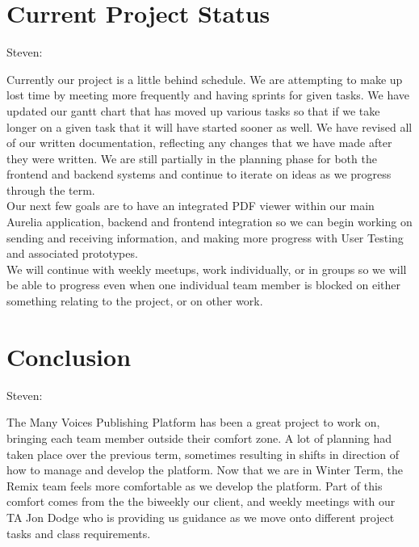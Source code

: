 \documentclass[onecolumn, draftclsnofoot,10pt, compsoc]{IEEEtran}
\begin{document}
\section{Current Project Status}
\noindent Steven:

\noindent Currently our project is a little behind schedule. We are attempting to make up
lost time by meeting more frequently and having sprints for given tasks. We have updated our 
gantt chart that has moved up various tasks so that if we take longer on a given task that 
it will have started sooner as well. We have revised all of our written documentation, reflecting
any changes that we have made after they were written. We are still partially in the planning 
phase for both the frontend and backend systems and continue to iterate on ideas as we progress
through the term. \\

\noindent Our next few goals are to have an integrated PDF viewer within our main Aurelia 
application, backend and frontend integration so we can begin working on sending and receiving 
information, and making more progress with User Testing and associated prototypes. \\

\noindent We will continue with weekly meetups, work individually, or in groups so we will 
be able to progress even when one individual team member is blocked on either something 
relating to the project, or on other work.



\section{Conclusion}
\noindent Steven:

\noindent The Many Voices Publishing Platform has been a great project to work on,
bringing each team member outside their comfort zone. A lot of planning had
taken place over the previous term, sometimes resulting in shifts in direction of how
to manage and develop the platform. Now that we are in Winter Term, the Remix team feels 
more comfortable as we develop the platform. Part of this comfort comes from the the biweekly our client, 
and weekly meetings with our TA Jon Dodge who is providing us guidance as we move onto different
project tasks and class requirements.
\end{document}
